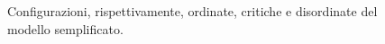 \documentclass[a4paper]{article}
\begin{document}
\begin{figure}[H]
\hspace{10pt}
\hspace{10pt}
\centering
\caption{Configurazioni, rispettivamente, ordinate, critiche e disordinate del modello semplificato.}
\end{figure}
\end{document}
